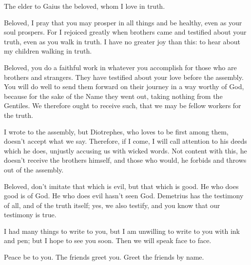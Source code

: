 
%

\vspace{-1.4in}



\mychapter{}  \myverse*{}The elder to Gaius the beloved, whom I love in truth.


\myverse{}Beloved, I pray that you may prosper in all things and be healthy, even as your soul prospers. \myverse{}For I rejoiced greatly when brothers came and testified about your truth, even as you walk in truth. \myverse{}I have no greater joy than this: to hear about my children walking in truth.


\myverse{}Beloved, you do a faithful work in whatever you accomplish for those who are brothers and strangers. \myverse{}They have testified about your love before the assembly. You will do well to send them forward on their journey in a way worthy of God, \myverse{}because for the sake of the Name they went out, taking nothing from the Gentiles. \myverse{}We therefore ought to receive such, that we may be fellow workers for the truth.


\myverse{}I wrote to the assembly, but Diotrephes, who loves to be first among them, doesn’t accept what we say. \myverse{}Therefore, if I come, I will call attention to his deeds which he does, unjustly accusing us with wicked words. Not content with this, he doesn’t receive the brothers himself, and those who would, he forbids and throws out of the assembly.


\myverse{}Beloved, don’t imitate that which is evil, but that which is good. He who does good is of God. He who does evil hasn’t seen God. \myverse{}Demetrius has the testimony of all, and of the truth itself; yes, we also testify, and you know that our testimony is true.


\myverse{}I had many things to write to you, but I am unwilling to write to you with ink and pen; \myverse{}but I hope to see you soon. Then we will speak face to face.

Peace be to you. The friends greet you. Greet the friends by name.


